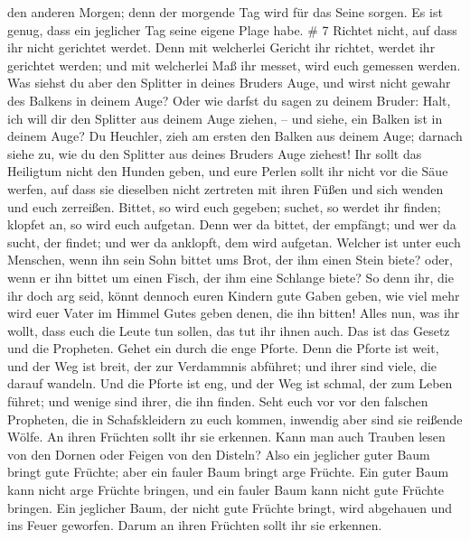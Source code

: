 den anderen Morgen; denn der morgende Tag wird für das Seine sorgen. Es
ist genug, dass ein jeglicher Tag seine eigene Plage habe. \# 7
 Richtet nicht, auf dass ihr nicht gerichtet werdet.
 Denn mit welcherlei Gericht ihr richtet, werdet ihr
gerichtet werden; und mit welcherlei Maß ihr messet, wird euch gemessen
werden.  Was siehst du aber den Splitter in deines Bruders
Auge, und wirst nicht gewahr des Balkens in deinem Auge? 
Oder wie darfst du sagen zu deinem Bruder: Halt, ich will dir den
Splitter aus deinem Auge ziehen, -- und siehe, ein Balken ist in deinem
Auge?  Du Heuchler, zieh am ersten den Balken aus deinem
Auge; darnach siehe zu, wie du den Splitter aus deines Bruders Auge
ziehest!  Ihr sollt das Heiligtum nicht den Hunden geben,
und eure Perlen sollt ihr nicht vor die Säue werfen, auf dass sie
dieselben nicht zertreten mit ihren Füßen und sich wenden und euch
zerreißen.  Bittet, so wird euch gegeben; suchet, so werdet
ihr finden; klopfet an, so wird euch aufgetan.  Denn wer da
bittet, der empfängt; und wer da sucht, der findet; und wer da anklopft,
dem wird aufgetan.  Welcher ist unter euch Menschen, wenn
ihn sein Sohn bittet ums Brot, der ihm einen Stein biete? 
oder, wenn er ihn bittet um einen Fisch, der ihm eine Schlange biete?
 So denn ihr, die ihr doch arg seid, könnt dennoch euren
Kindern gute Gaben geben, wie viel mehr wird euer Vater im Himmel Gutes
geben denen, die ihn bitten!  Alles nun, was ihr wollt,
dass euch die Leute tun sollen, das tut ihr ihnen auch. Das ist das
Gesetz und die Propheten.  Gehet ein durch die enge Pforte.
Denn die Pforte ist weit, und der Weg ist breit, der zur Verdammnis
abführet; und ihrer sind viele, die darauf wandeln.  Und
die Pforte ist eng, und der Weg ist schmal, der zum Leben führet; und
wenige sind ihrer, die ihn finden.  Seht euch vor vor den
falschen Propheten, die in Schafskleidern zu euch kommen, inwendig aber
sind sie reißende Wölfe.  An ihren Früchten sollt ihr sie
erkennen. Kann man auch Trauben lesen von den Dornen oder Feigen von den
Disteln?  Also ein jeglicher guter Baum bringt gute
Früchte; aber ein fauler Baum bringt arge Früchte.  Ein
guter Baum kann nicht arge Früchte bringen, und ein fauler Baum kann
nicht gute Früchte bringen.  Ein jeglicher Baum, der nicht
gute Früchte bringt, wird abgehauen und ins Feuer geworfen.
 Darum an ihren Früchten sollt ihr sie erkennen.
